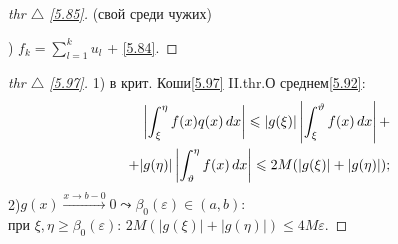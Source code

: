 
\begin{minipage}[]{0.45\textwidth}
\begin{proof}[ 
thr $\triangle$ 
\eqref{5.85}] (свой среди чужих)

\phantom{42} 

) $f_k = \sum_{l=1}^k u_l$ + \eqref{5.84}. 
\end{proof}



\begin{proof}[
thr $\triangle$
\eqref{5.97}]

\phantom{42}
\noindent

1) в крит. Коши\eqref{5.97} II.thr.О среднем\eqref{5.92}:\\
\begin{equation*}
\begin{aligned}
	\left|\int_\xi^\eta f(x) q(x) \, d x \right| \leqslant |g(\xi)| \left|\int_\xi^\vartheta f(x) \, d x \right| +\\
	 + |g(\eta)| \left|\int_\vartheta^\eta f(x) \, d x \right| \leqslant 2 M (|g(\xi)| + |g(\eta)|);
\end{aligned}
\end{equation*}
2)$g(x) \overset{x \to b-0}{\to} 0 \leadsto \beta_0(\varepsilon) \in (a,b):$\\
при $\xi, \eta \geq \beta_0(\varepsilon):\, 2 M (|g(\xi)| + |g(\eta)|) \leq 4 M \varepsilon $.
\end{proof}
\end{minipage}
\hfill
